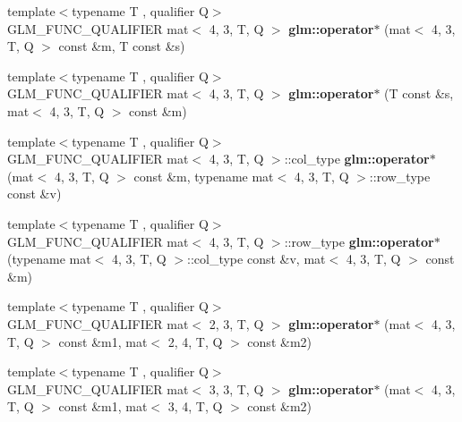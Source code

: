 \begin{DoxyCompactItemize}
\item 
\mbox{\label{type__mat4x3_8inl_abc6eb2f8f6ed5072dd6d5068d837554c}} 
{\footnotesize template$<$typename T , qualifier Q$>$ }\\G\+L\+M\+\_\+\+F\+U\+N\+C\+\_\+\+Q\+U\+A\+L\+I\+F\+I\+ER mat$<$ 4, 3, T, Q $>$ {\bfseries glm\+::operator$\ast$} (mat$<$ 4, 3, T, Q $>$ const \&m, T const \&s)
\item 
\mbox{\label{type__mat4x3_8inl_a8fcf223bad353557bb7020f58e1737a4}} 
{\footnotesize template$<$typename T , qualifier Q$>$ }\\G\+L\+M\+\_\+\+F\+U\+N\+C\+\_\+\+Q\+U\+A\+L\+I\+F\+I\+ER mat$<$ 4, 3, T, Q $>$ {\bfseries glm\+::operator$\ast$} (T const \&s, mat$<$ 4, 3, T, Q $>$ const \&m)
\item 
\mbox{\label{type__mat4x3_8inl_a19e7474b9ee969bd7366faea6718a089}} 
{\footnotesize template$<$typename T , qualifier Q$>$ }\\G\+L\+M\+\_\+\+F\+U\+N\+C\+\_\+\+Q\+U\+A\+L\+I\+F\+I\+ER mat$<$ 4, 3, T, Q $>$\+::col\+\_\+type {\bfseries glm\+::operator$\ast$} (mat$<$ 4, 3, T, Q $>$ const \&m, typename mat$<$ 4, 3, T, Q $>$\+::row\+\_\+type const \&v)
\item 
\mbox{\label{type__mat4x3_8inl_a85085549774dcf774457ddff3b5e4088}} 
{\footnotesize template$<$typename T , qualifier Q$>$ }\\G\+L\+M\+\_\+\+F\+U\+N\+C\+\_\+\+Q\+U\+A\+L\+I\+F\+I\+ER mat$<$ 4, 3, T, Q $>$\+::row\+\_\+type {\bfseries glm\+::operator$\ast$} (typename mat$<$ 4, 3, T, Q $>$\+::col\+\_\+type const \&v, mat$<$ 4, 3, T, Q $>$ const \&m)
\item 
\mbox{\label{type__mat4x3_8inl_ab850e35aeee0c07d06e0c111114d4109}} 
{\footnotesize template$<$typename T , qualifier Q$>$ }\\G\+L\+M\+\_\+\+F\+U\+N\+C\+\_\+\+Q\+U\+A\+L\+I\+F\+I\+ER mat$<$ 2, 3, T, Q $>$ {\bfseries glm\+::operator$\ast$} (mat$<$ 4, 3, T, Q $>$ const \&m1, mat$<$ 2, 4, T, Q $>$ const \&m2)
\item 
\mbox{\label{type__mat4x3_8inl_aa4ec2976766dcc7d19733a50ee21ac73}} 
{\footnotesize template$<$typename T , qualifier Q$>$ }\\G\+L\+M\+\_\+\+F\+U\+N\+C\+\_\+\+Q\+U\+A\+L\+I\+F\+I\+ER mat$<$ 3, 3, T, Q $>$ {\bfseries glm\+::operator$\ast$} (mat$<$ 4, 3, T, Q $>$ const \&m1, mat$<$ 3, 4, T, Q $>$ const \&m2)

\end{DoxyCompactItemize}
